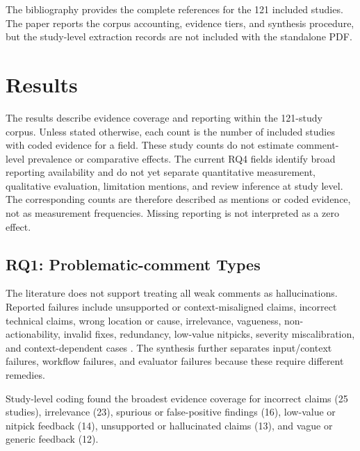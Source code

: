 \documentclass[10pt]{article}
\begin{document}
The bibliography provides the complete references for the 121 included studies. The paper reports the corpus accounting, evidence tiers, and synthesis procedure, but the study-level extraction records are not included with the standalone PDF.




\section{Results}

The results describe evidence coverage and reporting within the 121-study corpus. Unless stated otherwise, each count is the number of included studies with coded evidence for a field. These study counts do not estimate comment-level prevalence or comparative effects. The current RQ4 fields identify broad reporting availability and do not yet separate quantitative measurement, qualitative evaluation, limitation mentions, and review inference at study level. The corresponding counts are therefore described as mentions or coded evidence, not as measurement frequencies. Missing reporting is not interpreted as a zero effect.

\subsection{RQ1: Problematic-comment Types}

The literature does not support treating all weak comments as hallucinations. Reported failures include unsupported or context-misaligned claims, incorrect technical claims, wrong location or cause, irrelevance, vagueness, non-actionability, invalid fixes, redundancy, low-value nitpicks, severity miscalibration, and context-dependent cases \cite{p02_tantithamthavorn2026_hallujudge,p19_nguyen2025_fine_grained_classification,p21_peng2025_icodereviewer,p58_jin2026_reliable_code_reviewers}. The synthesis further separates input/context failures, workflow failures, and evaluator failures because these require different remedies.

Study-level coding found the broadest evidence coverage for incorrect claims (25 studies), irrelevance (23), spurious or false-positive findings (16), low-value or nitpick feedback (14), unsupported or hallucinated claims (13), and vague or generic feedback (12).
\end{document}
